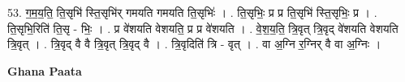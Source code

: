 \documentclass[17pt]{extarticle}
\begin{document}
53. ग॒म॒य॒ति॒ ति॒सृभि॑ स्ति॒सृभि॑र् गमयति गमयति ति॒सृभिः॑ । . ति॒सृभिः॒ प्र प्र ति॒सृभि॑ स्ति॒सृभिः॒ प्र । . ति॒सृभि॒रिति॑ ति॒सृ - भिः॒ । . प्र वे॑शयति वेशयति॒ प्र प्र वे॑शयति । . वे॒श॒य॒ति॒ त्रि॒वृत् त्रि॒वृद् वे॑शयति वेशयति त्रि॒वृत् । . त्रि॒वृद् वै वै त्रि॒वृत् त्रि॒वृद् वै । . त्रि॒वृदिति॑ त्रि - वृत् । . वा अ॒ग्नि र॒ग्निर् वै वा अ॒ग्निः । \newline

\textbf{Ghana Paata } \newline
\end{document}
